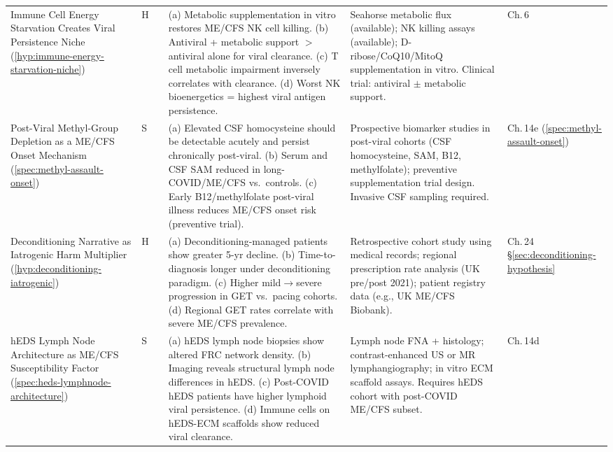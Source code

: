 \begin{longtable}{%
  p{3.0cm}
  >{\centering\arraybackslash}p{0.55cm}
  >{\centering\arraybackslash}p{1.0cm}
  p{3.8cm}
  p{3.8cm}
  p{2.2cm}
}
Immune Cell Energy Starvation Creates Viral Persistence Niche
(\ref{hyp:immune-energy-starvation-niche})
& H & 0.40 &
(a) Metabolic supplementation in vitro restores ME/CFS NK cell killing.
(b) Antiviral + metabolic support $>$ antiviral alone for viral clearance.
(c) T cell metabolic impairment inversely correlates with clearance.
(d) Worst NK bioenergetics = highest viral antigen persistence.
&
Seahorse metabolic flux (available); NK killing assays (available);
D-ribose/CoQ10/MitoQ supplementation in vitro.
Clinical trial: antiviral $\pm$ metabolic support.
&
Ch.\,6 \\[6pt]

Post-Viral Methyl-Group Depletion as a ME/CFS Onset Mechanism
(\ref{spec:methyl-assault-onset})
&
S & 0.25
&
(a) Elevated CSF homocysteine should be detectable acutely and persist chronically post-viral.
(b) Serum and CSF SAM reduced in long-COVID/ME/CFS vs.\ controls.
(c) Early B12/methylfolate post-viral illness reduces ME/CFS onset risk (preventive trial).
&
Prospective biomarker studies in post-viral cohorts (CSF homocysteine, SAM, B12, methylfolate);
preventive supplementation trial design. Invasive CSF sampling required.
&
Ch.\,14e (\ref{spec:methyl-assault-onset}) \\[6pt]

Deconditioning Narrative as Iatrogenic Harm Multiplier
(\ref{hyp:deconditioning-iatrogenic})
& H & 0.50 &
(a) Deconditioning-managed patients show greater 5-yr decline.
(b) Time-to-diagnosis longer under deconditioning paradigm.
(c) Higher mild$\to$severe progression in GET vs.\ pacing cohorts.
(d) Regional GET rates correlate with severe ME/CFS prevalence.
&
Retrospective cohort study using medical records;
regional prescription rate analysis (UK pre/post 2021);
patient registry data (e.g., UK ME/CFS Biobank).
&
Ch.\,24 \S\ref{sec:deconditioning-hypothesis} \\[6pt]

hEDS Lymph Node Architecture as ME/CFS Susceptibility Factor
(\ref{spec:heds-lymphnode-architecture})
& S & 0.25 &
(a) hEDS lymph node biopsies show altered FRC network density.
(b) Imaging reveals structural lymph node differences in hEDS.
(c) Post-COVID hEDS patients have higher lymphoid viral persistence.
(d) Immune cells on hEDS-ECM scaffolds show reduced viral clearance.
&
Lymph node FNA + histology; contrast-enhanced US or MR lymphangiography;
in vitro ECM scaffold assays.
Requires hEDS cohort with post-COVID ME/CFS subset.
&
Ch.\,14d \\[6pt]


\end{longtable}
